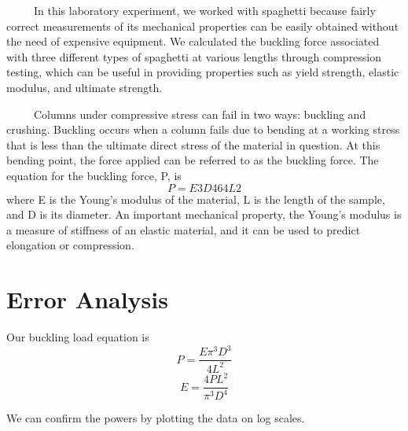 \documentclass{article}
\begin{document}
\ \ \ \ \ In this laboratory experiment, we worked with spaghetti because fairly correct measurements of its mechanical properties can be easily obtained without the need of expensive equipment. We calculated the buckling force associated with three different types of spaghetti at various lengths through compression testing, which can be useful in providing properties such as yield strength, elastic modulus, and ultimate strength.

\ \ \ \ \ Columns under compressive stress can fail in two ways: buckling and crushing. Buckling occurs when a column fails due to bending at a working stress that is less than the ultimate direct stress of the material in question. At this bending point, the force applied can be referred to as the buckling force.
The equation for the buckling force, P, is $$P=E3D464L2$$ where E is the Young’s modulus of the material, L is the length of the sample, and D is its diameter. An important mechanical property, the Young’s modulus is a measure of stiffness of an elastic material, and it can be used to predict elongation or compression.

\section{Error Analysis}

Our buckling load equation is
$$P = \frac{E\pi ^3D^3}{4L^2}$$
$$E = \frac{4PL^2}{\pi ^3D^4}$$

We can confirm the powers by plotting the data on log scales.
\end{document}
